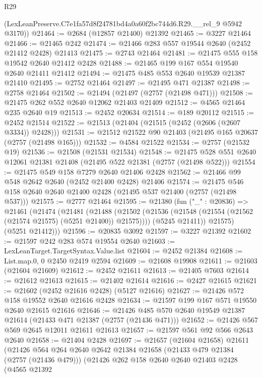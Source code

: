 \begin{lexlean}{R29}
\begin{coremodule}
      (LexLeanPreserve.C7e1fa57d8f24781bd4a0a60f2bc744d6.R29.__rel_9 @5942 @3170))
@21464 := @2684 (@12857 @21400) @21392
@21465 := @3227 @21464
@21466 := @21465 @242
@21474 := @21466 @283 @557 @19544 @2640 (@2452 @21412 @2428) @21413
@21475 := @2743 @21464
@21481 := @21475 @555 @158 @19542 @2640 @21412 @2428
@21488 := @21465 @199 @167 @554 @19540 @2640 @21411 @21412
@21494 := @21475 @485 @553 @2640 @19539 @21387 @21410
@21495 := @2752 @21464
@21497 := @21495 @471 @21387
@21498 := @2758 @21464
@21502 := @21494 (@21497 (@2757 (@21498 @471)))
@21508 := @21475 @262 @552 @2640 @12062 @21403 @21409
@21512 := @4565 @21464 @235 @2640 @19
@21513 := @2452 @20634
@21514 := @189 @20112
@21515 := @2452 @21514
@21522 := @21513 (@21404 (@21515 (@2452 (@2606 (@2607 @3334)) @2428)))
@21531 := @21512 @21522 @90 @21403 (@21495 @165 @20637 (@2757 (@21498 @165)))
@21532 := @4584 @21522
@21534 := @2757 (@21532 @19)
@21536 := @21508 (@21531 @21534)
@21548 := @21475 @528 @551 @2640 @12061 @21381 @21408 (@21495 @522 @21381 (@2757 (@21498 @522)))
@21554 := @21475 @549 @158 @7279 @2640 @21406 @2428
@21562 := @21466 @99 @548 @2642 @2640 (@2452 @21400 @2428) @21406
@21574 := @21475 @546 @158 @2640 @2640 @21400 @2428 (@21495 @537 @21400 (@2757 (@21498 @537)))
@21575 := @2777 @21464
@21595 := @21380
    (fun ("_" : @20836) =>
    @21461
      (@21474
        (@21481
          (@21488
            (@21502 (@21536 (@21548 (@21554 (@21562 (@21574 @21575) (@5251 @21400)) @21575))))
            (@5245 @21411))
          @21575)
        (@5251 @21412)))
@21596 := @20835 @3092
@21597 := @3227 @21392
@21602 := @21597 @242 @283 @574 @19554 @2640
@21603 := LexLeanTarget.TargetSyntax.Value.list
@21604 := @2452 @21384
@21608 := List.map.{0, 0} @2450 @2419 @2594
@21609 := @21608 @19908
@21611 := @21603 (@21604 @21609)
@21612 := @2452 @21611
@21613 := @21405 @7603
@21614 := @21612 @21613
@21615 := @21402 @21614
@21616 := @2427 @21615
@21621 := @21602 (@2452 @21616 @2428) (@5127 @21616)
@21627 := @21426 @572 @158 @19552 @2640 @21616 @2428
@21634 := @21597 @199 @167 @571 @19550 @2640 @21615 @21616
@21646 := @21426 @485 @570 @2640 @19549 @21387 @21614 (@21433 @471 @21387 (@2757 (@21436 @471)))
@21652 := @21426 @567 @569 @2645 @12011 @21611 @21613
@21657 := @21597 @561 @92 @566 @2643 @2640
@21658 := @21404 @2428
@21697 := @21657
    (@21604 @21658)
    @21611
    (@21426
      @564
      @264
      @2640
      @2642
      @21384
      @21658
      (@21433 @479 @21384 (@2757 (@21436 @479)))
      (@21426
        @262
        @158
        @2640
        @2640
        @21403
        @2428
        (@4565
          @21392

\end{coremodule}
\end{lexlean}
